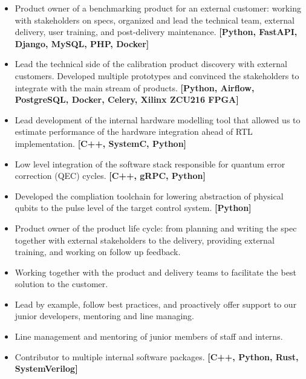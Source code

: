 \documentclass[10pt,a4paper,ragged2e,withhyper]{altacv}
\begin{document}


\begin{itemize}

    \item
    Product owner of a benchmarking product for an external customer:
    working with stakeholders on specs, organized and lead the technical team,
    external delivery, user training, and post-delivery maintenance.
    {\bf [Python, FastAPI, Django, MySQL, PHP, Docker]}
    
    \item
    Lead the technical side of the calibration product discovery with external
    customers.
    Developed multiple prototypes and convinced the stakeholders to integrate
    with the main stream of products.
    {\bf [Python, Airflow, PostgreSQL, Docker, Celery, Xilinx ZCU216 FPGA]}
    
    \item
    Lead development of the internal hardware modelling tool that allowed us
    to estimate performance of the hardware integration ahead of RTL implementation.
    {\bf [C++, SystemC, Python]}

    \item
    Low level integration of the software stack responsible for quantum error
    correction (QEC) cycles.
    {\bf [C++, gRPC, Python]}
    
    \item
    Developed the compliation toolchain for lowering abstraction of physical
    qubits to the pulse level of the target control system.
    {\bf [Python]}
    
    \item
    Product owner of the product life cycle: from planning
    and writing the spec together with external stakeholders to the delivery,
    providing external training, and working on follow up feedback.
    
    \item
    Working together with the product and delivery teams to facilitate the
    best solution to the customer.
    
    \item
    Lead by example, follow best practices, and proactively offer support to our
    junior developers, mentoring and line managing.
    
    \item
    Line management and mentoring of junior members of staff and interns.
    
    \item
    Contributor to multiple internal software packages.
    {\bf [C++, Python, Rust, SystemVerilog]}


\end{itemize}
\end{document}

